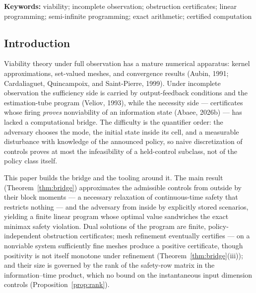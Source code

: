 \documentclass[10pt,twocolumn]{article}
\theoremstyle{plain}
\theoremstyle{definition}
\theoremstyle{remark}
\begin{document}
\begin{abstract}
standard solver (HiGHS) across a five-point mesh refinement; optimality is
certified in exact rational arithmetic by independent primal and dual
witnesses, the solver agreeing with the exact values to at most
\(4.2 \times 10^{-17}\), and the refinement obeys the closed law
\(\rho(h) = 3/50 - Th/4\) (an unrestricted level, nonnegative on this
family for \(h \le \tfrac15\)). A finite-side reference library,
\texttt{viacert}, packages the exact finite-horizon recursion and the
fibre-partition criteria behind a pluggable finite-system interface, with
twelve audited identities in its self-test; the bridge's continuous
programs live in the campaign scripts, not in the library. All exact verification paths for the reported rational benchmark run in
integer and rational arithmetic; solver outputs are numerical
confirmations, never proof objects.
\end{abstract}

\textbf{Keywords:} viability; incomplete observation; obstruction
certificates; linear programming; semi-infinite programming; exact
arithmetic; certified computation

\subsection{Introduction}\label{introduction}

Viability theory under full observation has a mature numerical apparatus:
kernel approximations, set-valued meshes, and convergence results
(Aubin, 1991; Cardaliaguet, Quincampoix, and Saint-Pierre, 1999). Under
incomplete observation the sufficiency side is carried by output-feedback
conditions and the estimation-tube program (Veliov, 1993), while the
necessity side --- certificates whose firing \emph{proves} nonviability of an
information state (Abaee, 2026b) --- has lacked a computational bridge. The
difficulty is the quantifier order: the adversary chooses the mode, the
initial state inside its cell, and a measurable disturbance with knowledge of
the announced policy, so naive discretization of controls proves at most the
infeasibility of a held-control subclass, not of the policy class itself.

This paper builds the bridge and the tooling around it. The main result
(Theorem~\ref{thm:bridge}) approximates the admissible controls from outside
by their block moments --- a necessary relaxation of continuous-time safety
that restricts nothing --- and the adversary from inside by explicitly stored
scenarios, yielding a finite linear program whose optimal value sandwiches
the exact minimax safety violation. Dual solutions of the program are finite,
policy-independent obstruction certificates; mesh refinement eventually
certifies --- on a nonviable system sufficiently fine meshes produce a
positive certificate, though positivity is not itself monotone under
refinement (Theorem~\ref{thm:bridge}(iii)); and their size is governed by
the rank of the
safety-row matrix in the information--time product, which no bound on the
instantaneous input dimension controls (Proposition~\ref{prop:rank}).
\end{document}
